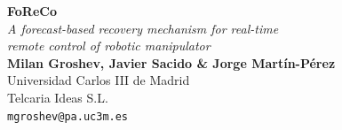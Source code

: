 \documentclass[a0,portrait]{a0poster}
\begin{document}


\begin{minipage}[b]{0.75\linewidth}
    \veryHuge \color{NavyBlue} \textbf{FoReCo} \color{Black}\\[.5cm] %
\Huge\textit{A forecast-based recovery mechanism for real-time\\remote control of robotic manipulator}\\[2cm] %
\huge \textbf{Milan Groshev, Javier Sacido \& Jorge Martín-Pérez}\\[0.5cm] %
\huge Universidad Carlos III de Madrid\\[0.4cm] %
\huge Telcaria Ideas S.L.\\[0.4cm] %
\Large \texttt{mgroshev@pa.uc3m.es}\\ %
\end{minipage}
%
\end{document}
